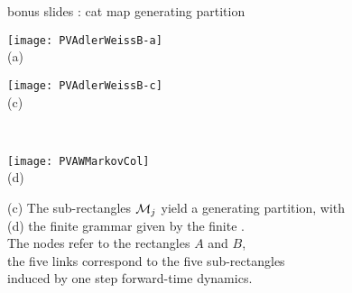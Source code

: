 \begin{frame}{bonus slides : cat map generating partition}
\begin{center}
            \begin{minipage}[c]{0.23\textwidth}\begin{center}
\texttt{[image: PVAdlerWeissB-a]}\\(a)
            \end{center}\end{minipage}
            \begin{minipage}[c]{0.23\textwidth}\begin{center}
\texttt{[image: PVAdlerWeissB-c]}\\(c)
            \end{center}\end{minipage}
            ~~~
            \begin{minipage}[c]{0.09\textwidth}\begin{center}
\texttt{[image: PVAWMarkovCol]}\\(d)
            \end{center}\end{minipage}
\end{center}
(c)
The sub-rectangles $\mathcal{M}_j$ yield a generating partition, with
\\
(d)
the finite grammar given by the finite {\markGraph}. \\
The nodes
refer to the rectangles $A$ and $B$, \\
the five links correspond to the five sub-rectangles \\
induced by one step forward-time dynamics.
\end{frame}

